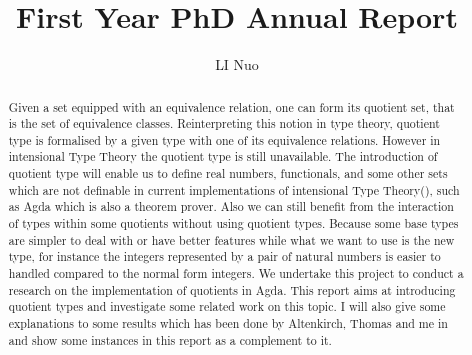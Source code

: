 \documentclass[envcountsame]{llncs}
\title{First Year PhD Annual Report}
\author{LI Nuo}
\institute{University of Nottingham}
\newcommand{\todo}[1]{\textcolor{red}{TO~DO:~#1}}
\newcommand{\itt}{intensional Type Theory}
\begin{document}
\maketitle


\tableofcontents

\newpage 

\begin{abstract}



Given a set equipped with an equivalence relation, one can form its
quotient set, that is the set of equivalence classes. Reinterpreting
this notion in type theory, quotient type is formalised by a given type with
one of its equivalence relations. However in \itt{}  the quotient type is
still unavailable. The introduction of quotient type will enable us to define
real numbers, functionals, and some other sets which are not definable
in current implementations of \itt(),  such as Agda which is also a
theorem prover. Also we can still benefit from the interaction of
types within some quotients without using quotient types. Because some
base types are simpler to deal with or have better features while what
we want to use is the new type, for instance the integers represented
by a pair of natural numbers is easier to handled compared to the
normal form integers. We undertake this project to conduct a research
on the implementation of quotients in Agda. This report aims at
introducing quotient types and investigate some related work on this
topic. I will also give some explanations to some
results which has been done by Altenkirch, Thomas and me in \cite{aan}
and show some instances in this report as a complement to it.


\end{abstract}
\end{document}

